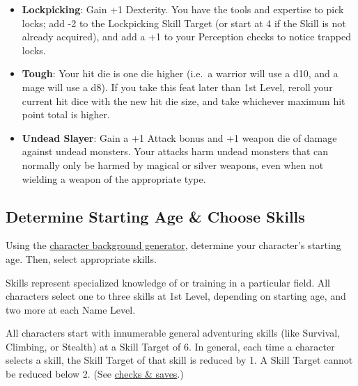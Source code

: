 \documentclass{book}
\providecommand{\tightlist}{%
\setlength{\itemsep}{0pt}\setlength{\parskip}{0pt}}
\begin{document}
\begin{itemize}
  \begin{itemize}
  \tightlist
  \item
    Heal at least 2 HP per night if you get a good night's sleep, and
    still heal even if marching in terrain that normally prevents such.
  \item
    Lower your Survival and Tracking Skill Targets by 1.
  \item
    You're less likely to be surprised in your chosen terrain
  \end{itemize}
\item
  \textbf{Lockpicking}: Gain +1 Dexterity. You have the tools and
  expertise to pick locks; add -2 to the Lockpicking Skill Target (or
  start at 4 if the Skill is not already acquired), and add a +1 to your
  Perception checks to notice trapped locks.
\item
  \textbf{Tough}: Your hit die is one die higher (i.e.~a warrior will
  use a d10, and a mage will use a d8). If you take this feat later than
  1st Level, reroll your current hit dice with the new hit die size, and
  take whichever maximum hit point total is higher.
\item
  \textbf{Undead Slayer}: Gain a +1 Attack bonus and +1 weapon die of
  damage against undead monsters. Your attacks harm undead monsters that
  can normally only be harmed by magical or silver weapons, even when
  not wielding a weapon of the appropriate type.
\end{itemize}

\subsection*{Determine Starting Age \& Choose
Skills}\label{determine-starting-age-choose-skills}

Using the \href{background.md\#starting-age}{character background
generator}, determine your character's starting age. Then, select
appropriate skills.

Skills represent specialized knowledge of or training in a particular
field. All characters select one to three skills at 1st Level, depending
on starting age, and two more at each Name Level.

All characters start with innumerable general adventuring skills (like
Survival, Climbing, or Stealth) at a Skill Target of 6. In general, each
time a character selects a skill, the Skill Target of that skill is
reduced by 1. A Skill Target cannot be reduced below 2. (See
\hyperref[checks-saves]{checks \& saves}.)
\end{document}
